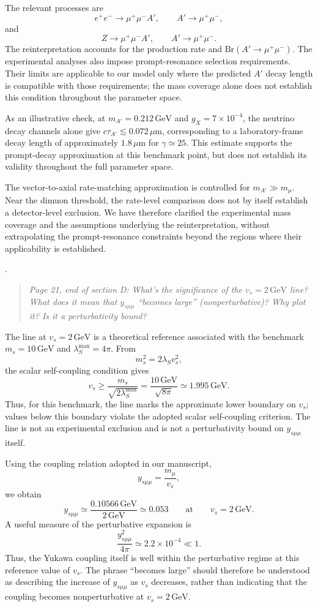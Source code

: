 \documentclass[12pt,a4paper]{article}
\begin{document}
The relevant processes are
\[
e^+e^-\to\mu^+\mu^-A',
\qquad A'\to\mu^+\mu^-,
\]
and
\[
Z\to\mu^+\mu^-A',
\qquad A'\to\mu^+\mu^-.
\]
The reinterpretation accounts for the production rate and \(\mathrm{Br}(A'\to\mu^+\mu^-)\). The experimental analyses also impose prompt-resonance selection requirements. Their limits are applicable to our model only where the predicted \(A'\) decay length is compatible with those requirements; the mass coverage alone does not establish this condition throughout the parameter space.

As an illustrative check, at \(m_{A'}=0.212\,\mathrm{GeV}\) and \(g_X=7\times10^{-4}\), the neutrino decay channels alone give \(c\tau_{A'}\lesssim0.072\,\mu\mathrm{m}\), corresponding to a laboratory-frame decay length of approximately \(1.8\,\mu\mathrm{m}\) for \(\gamma\simeq25\). This estimate supports the prompt-decay approximation at this benchmark point, but does not establish its validity throughout the full parameter space.

The vector-to-axial rate-matching approximation is controlled for \(m_{A'}\gg m_\mu\). Near the dimuon threshold, the rate-level comparison does not by itself establish a detector-level exclusion. We have therefore clarified the experimental mass coverage and the assumptions underlying the reinterpretation, without extrapolating the prompt-resonance constraints beyond the regions where their applicability is established.

\medskip
{}. \begin{quote}\itshape
Page 21, end of section D: What's the significance of the \(v_s=2\,\mathrm{GeV}\) line? What does it mean that \(y_{s\mu\mu}\) ``becomes large'' (nonperturbative)? Why plot it? Is it a perturbativity bound?
\end{quote}

The line at \(v_s=2\,\mathrm{GeV}\) is a theoretical reference associated with the benchmark \(m_s=10\,\mathrm{GeV}\) and \(\lambda_S^{\max}=4\pi\). From
\[
m_s^2=2\lambda_Sv_s^2,
\]
the scalar self-coupling condition gives
\[
v_s\geq\frac{m_s}{\sqrt{2\lambda_S^{\max}}}
=\frac{10\,\mathrm{GeV}}{\sqrt{8\pi}}
\simeq1.995\,\mathrm{GeV}.
\]
Thus, for this benchmark, the line marks the approximate lower boundary on \(v_s\); values below this boundary violate the adopted scalar self-coupling criterion. The line is not an experimental exclusion and is not a perturbativity bound on \(y_{s\mu\mu}\) itself.

Using the coupling relation adopted in our manuscript,
\[
y_{s\mu\mu}=\frac{m_\mu}{v_s},
\]
we obtain
\[
y_{s\mu\mu}\simeq
\frac{0.10566\,\mathrm{GeV}}{2\,\mathrm{GeV}}
\simeq0.053
\qquad\text{at}\qquad v_s=2\,\mathrm{GeV}.
\]
A useful measure of the perturbative expansion is
\[
\frac{y_{s\mu\mu}^2}{4\pi}
\simeq2.2\times10^{-4}\ll1.
\]
Thus, the Yukawa coupling itself is well within the perturbative regime at this reference value of \(v_s\). The phrase ``becomes large'' should therefore be understood as describing the increase of \(y_{s\mu\mu}\) as \(v_s\) decreases, rather than indicating that the coupling becomes nonperturbative at \(v_s=2\,\mathrm{GeV}\).
\end{document}
